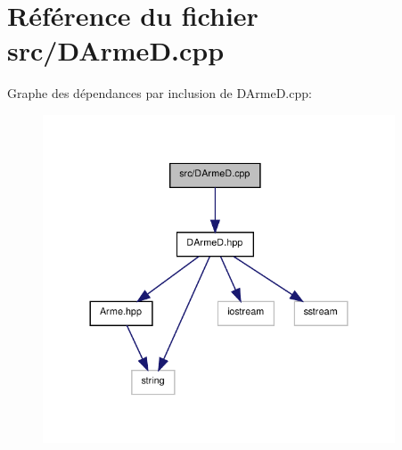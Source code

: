 \section{Référence du fichier src/\-D\-Arme\-D.cpp}
\label{_d_arme_d_8cpp}
Graphe des dépendances par inclusion de D\-Arme\-D.\-cpp\-:\nopagebreak
\begin{figure}[H]
\begin{center}
\leavevmode
\includegraphics[width=296pt]{_d_arme_d_8cpp__incl}
\end{center}
\end{figure}
